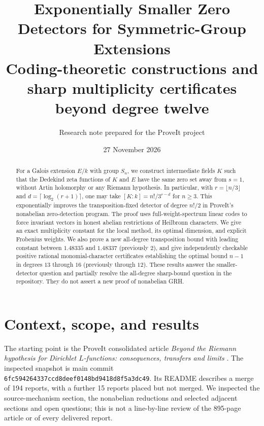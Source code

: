 \documentclass[11pt]{article}
\title{Exponentially Smaller Zero Detectors for Symmetric-Group Extensions\\[3pt]\large Coding-theoretic constructions and sharp multiplicity certificates beyond degree twelve}
\author{Research note prepared for the ProveIt project}
\date{27 November 2026}
\theoremstyle{remark}\newtheorem{remark}[theorem]{Remark}
\begin{document}
\maketitle
\begin{abstract}
For a Galois extension $E/k$ with group $S_n$, we construct intermediate fields $K$ such that the Dedekind zeta functions of $K$ and $E$ have the same zero set away from $s=1$, without Artin holomorphy or any Riemann hypothesis. In particular, with $r=\lfloor n/3\rfloor$ and $d=\lceil\log_2(r+1)\rceil$, one may take $[K:k]=n!/3^{r-d}$ for $n\ge3$. This exponentially improves the transposition-fixed detector of degree $n!/2$ in ProveIt's nonabelian zero-detection program. The proof uses full-weight-spectrum linear codes to force invariant vectors in honest abelian restrictions of Heilbronn characters. We give an exact multiplicity constant for the local method, its optimal dimension, and explicit Frobenius weights. We also prove a new all-degree transposition bound with leading constant between $1.48335$ and $1.48337$ (previously $2$), and give independently checkable positive rational monomial-character certificates establishing the optimal bound $n-1$ in degrees $13$ through $16$ (previously through $12$). These results answer the smaller-detector question and partially resolve the all-degree sharp-bound question in the repository. They do not assert a new proof of nonabelian GRH.
\end{abstract}
\tableofcontents

\section{Context, scope, and results}
The starting point is the ProveIt consolidated article \emph{Beyond the Riemann hypothesis for Dirichlet $L$-functions: consequences, transfers and limits} \cite{proveit}. The inspected snapshot is main commit \texttt{6fc594264337ccd8deef0148bd9418d8f5a3dc49}. Its README describes a merge of 194 reports, with a further 15 reports placed but not merged. We inspected the source-mechanism section, the nonabelian reductions and selected adjacent sections and open questions; this is not a line-by-line review of the 895-page article or of every delivered report.
\end{document}
